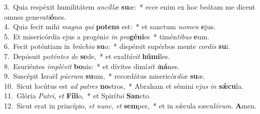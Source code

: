 {3.~}Quia respéxit humilitátem \textit{an}\textit{cíl}\textit{læ} \textbf{su}æ:~* ecce enim ex hoc beátam me dicent omnes gene\textit{ra}\textit{ti}\textbf{ó}nes.\\
{4.~}Quia fecit mihi \textit{ma}\textit{gna} \textit{qui} \textbf{po}\textbf{tens} est:~* et sanctum \textit{no}\textit{men} \textbf{e}jus.\\
{5.~}Et misericórdia ejus a progéni\textit{e} \textit{in} \textit{pro}\textbf{gé}\textbf{ni}es~* timén\textit{ti}\textit{bus} \textbf{e}um.\\
{6.~}Fecit poténtiam in \textit{brá}\textit{chi}\textit{o} \textbf{su}o:~* dispérsit supérbos mente \textit{cor}\textit{dis} \textbf{su}i.\\
{7.~}Depósuit po\textit{tén}\textit{tes} \textit{de} \textbf{se}de,~* et exal\textit{tá}\textit{vit} \textbf{hú}\textbf{mi}les.\\
{8.~}Esuriéntes \textit{im}\textit{plé}\textit{vit} \textbf{bo}nis:~* et dívites dimí\textit{sit} \textit{i}\textbf{ná}nes.\\
{9.~}Suscépit Israël \textit{pú}\textit{e}\textit{rum} \textbf{su}um,~* recordátus misericór\textit{di}\textit{æ} \textbf{su}æ.\\
{10.~}Sicut locútus est \textit{ad} \textit{pa}\textit{tres} \textbf{no}stros,~* Abraham et sémini e\textit{jus} \textit{in} \textbf{sǽ}\textbf{cu}la.\\
{11.~}Glória \textit{Pa}\textit{tri}, \textit{et} \textbf{Fí}\textbf{li}o,~* et Spirí\textit{tu}\textit{i} \textbf{San}cto.\\
{12.~}Sicut erat in princípio, \textit{et} \textit{nunc}, \textit{et} \textbf{sem}per,~* et in sǽcula sæcu\textit{ló}\textit{rum}. \textbf{A}men.\\
